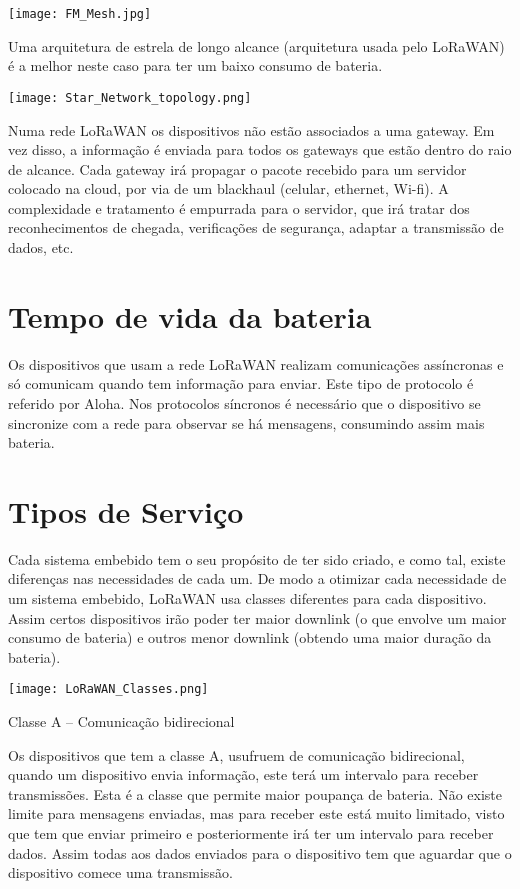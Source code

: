 \documentclass[a4paper]{article}
\begin{document}
\texttt{[image: FM\_Mesh.jpg]}


Uma arquitetura de estrela de longo alcance (arquitetura usada pelo LoRaWAN) é a melhor neste caso para ter um baixo consumo de bateria.

\texttt{[image: Star\_Network\_topology.png]}

Numa rede LoRaWAN os dispositivos não estão associados a uma gateway. Em vez disso, a informação é enviada para todos os gateways que estão dentro do raio de alcance. Cada gateway irá propagar o pacote recebido para um servidor colocado na cloud, por via de um blackhaul (celular, ethernet, Wi-fi). A complexidade e tratamento é empurrada para o servidor, que irá tratar dos reconhecimentos de chegada, verificações de segurança, adaptar a transmissão de dados, etc.

\section{Tempo de vida da bateria}

Os dispositivos que usam a rede LoRaWAN realizam comunicações assíncronas e só comunicam quando tem informação para enviar. Este tipo de protocolo é referido por Aloha. Nos protocolos síncronos é necessário que o dispositivo se sincronize com a rede para observar se há mensagens, consumindo assim mais bateria.

\section{Tipos de Serviço}

Cada sistema embebido tem o seu propósito de ter sido criado, e como tal, existe diferenças nas necessidades de cada um. De modo a otimizar cada necessidade de um sistema embebido, LoRaWAN usa classes diferentes para cada dispositivo. Assim certos dispositivos irão poder ter maior downlink (o que envolve um maior consumo de bateria) e outros menor downlink (obtendo uma maior duração da bateria).

\texttt{[image: LoRaWAN\_Classes.png]}

Classe A – Comunicação bidirecional

Os dispositivos que tem a classe A, usufruem de comunicação bidirecional, quando um dispositivo envia informação, este terá um intervalo para receber transmissões. Esta é a classe que permite maior poupança de bateria. Não existe limite para mensagens enviadas, mas para receber este está muito limitado, visto que tem que enviar primeiro e posteriormente irá ter um intervalo para receber dados. Assim todas aos dados enviados para o dispositivo tem que aguardar que o dispositivo comece uma transmissão. 
\end{document}
